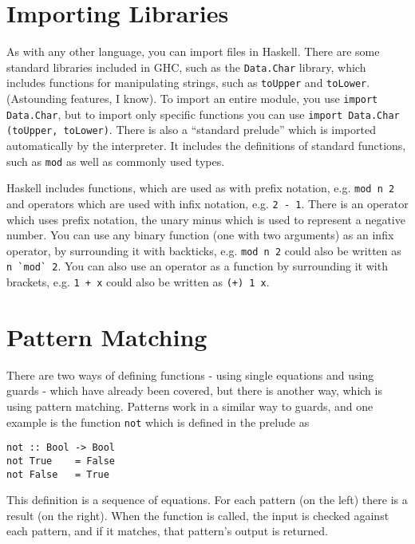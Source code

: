 
\section*{Importing Libraries}

As with any other language, you can import files in Haskell. There are some standard libraries included in GHC, such as
 the \verb`Data.Char` library, which includes functions for manipulating strings, such as \verb`toUpper` and
 \verb`toLower`. (Astounding features, I know). To import an entire module, you use \verb`import Data.Char`, but to
 import only specific functions you can use \verb`import Data.Char (toUpper, toLower)`. There is also a ``standard
 prelude'' which is imported automatically by the interpreter. It includes the definitions of standard functions, such
 as \verb`mod` as well as commonly used types.

Haskell includes functions, which are used as with prefix notation, e.g. \verb`mod n 2` and operators which are used
 with infix notation, e.g. \verb`2 - 1`. There is an operator which uses prefix notation, the unary minus which is used
 to represent a negative number. You can use any binary function (one with two arguments) as an infix operator, by
 surrounding it with backticks, e.g. \verb`mod n 2` could also be written as \verb+n `mod` 2+. You can also use an
 operator as a function by surrounding it with brackets, e.g. \verb`1 + x` could also be written as \verb`(+) 1 x`.

\section*{Pattern Matching}

There are two ways of defining functions - using single equations and using guards - which have already been covered,
 but there is another way, which is using pattern matching. Patterns work in a similar way to guards, and one example
 is the function \verb`not` which is defined in the prelude as 
\begin{verbatim}
not :: Bool -> Bool
not True    = False
not False   = True
\end{verbatim}
This definition is a sequence of equations. For each pattern (on the left) there is a result (on the right). When the
 function is called, the input is checked against each pattern, and if it matches, that pattern's output is returned.

